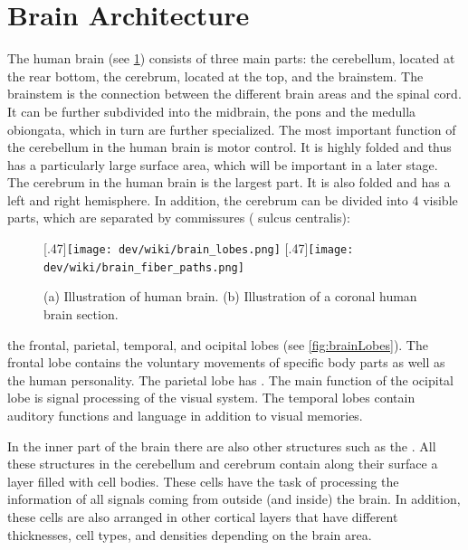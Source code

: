 \section{Brain Architecture}
% 
The human brain (see \cref{fig:humanBrain}) consists of three main parts: the cerebellum, located at the rear bottom, the cerebrum, located at the top, and the brainstem.
The brainstem is the connection between the different brain areas and the spinal cord.
It can be further subdivided into the midbrain, the pons and the medulla obiongata, which in turn are further specialized.
The most important function of the cerebellum in the human brain is motor control.
It is highly folded and thus has a particularly large surface area, which will be important in a later stage.
\\
% 
The cerebrum in the human brain is the largest part.
It is also folded and has a left and right hemisphere.
In addition, the cerebrum can be divided into 4 visible parts, which are separated by commissures (\eg{} sulcus centralis):
% 
\begin{figure}[!t]
\centering
[.47\textwidth]{\texttt{[image: dev/wiki/brain\_lobes.png]}}
\hspace*{\fill}
[.47\textwidth]{\texttt{[image: dev/wiki/brain\_fiber\_paths.png]}}
\caption{(a) Illustration of human brain. (b) Illustration of a coronal human brain section. }
\label{fig:humanBrain}
\end{figure}
% 
the frontal, parietal, temporal, and ocipital lobes (see \cref{fig:brainLobes}).
The frontal lobe contains the voluntary movements of specific body parts as well as the human personality.
The parietal lobe has \dummy{}.
The main function of the ocipital lobe is signal processing of the visual system.
The temporal lobes contain auditory functions and language in addition to visual memories.
\par
% 
In the inner part of the brain there are also other structures such as the \dummy{}.
All these structures in the cerebellum and cerebrum contain along their surface a layer filled with cell bodies.
These cells have the task of processing the information of all signals coming from outside (and inside) the brain.
In addition, these cells are also arranged in other cortical layers that have different thicknesses, cell types, and densities depending on the brain area.
